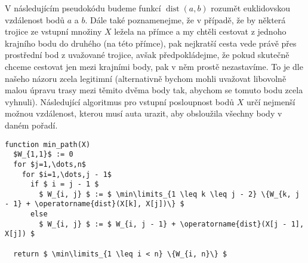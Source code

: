 \documentclass[12pt,a4paper]{article}
\theoremstyle{plain}
\newcommand\addfunctions[1]{%
  \lstset{morekeywords=[4]{#1}}}
\begin{document}
\pagestyle{fancy}                      %
\fancyhf{}                             %
\addtolength{\topmargin}{-30 pt}                   %
\setlength{\headsep}{10 pt}                      %
\renewcommand{\headrulewidth}{1 pt}                %

\addfunctions{min_path}

V následujícím pseudokódu budeme funkcí $ \operatorname{dist}(a,b) $ rozumět euklidovskou vzdálenost bodů $ a $ a $ b $. Dále také poznamenejme, že v případě, že by některá trojice ze vstupní množiny $ X $ ležela na přímce a my chtěli cestovat z jednoho krajního bodu do druhého (na této přímce), pak nejkratší cesta vede právě přes prostřední bod z uvažované trojice, avšak předpokládejme, že pokud skutečně chceme cestovat jen mezi krajními body, pak v něm prostě nezastavíme. To je dle našeho názoru zcela legitimní (alternativně bychom mohli uvažovat libovolně malou úpravu trasy mezi těmito dvěma body tak, abychom se tomuto bodu zcela vyhnuli). Následující algoritmus pro vstupní posloupnost bodů $ X $ určí nejmenší možnou vzdálenost, kterou musí auta urazit, aby obsloužila všechny body v daném pořadí.

\begin{lstlisting}[mathescape]
function min_path(X)
  $W_{1,1}$ := 0
  for $j=1,\dots,n$
    for $i=1,\dots,j - 1$
      if $ i = j - 1 $
        $ W_{i, j} $ := $ \min\limits_{1 \leq k \leq j - 2} \{W_{k, j - 1} + \operatorname{dist}(X[k], X[j])\} $
      else
        $ W_{i, j} $ := $ W_{i, j - 1} + \operatorname{dist}(X[j - 1], X[j]) $
  
  return $ \min\limits_{1 \leq i < n} \{W_{i, n}\} $

\end{lstlisting}
\end{document}
